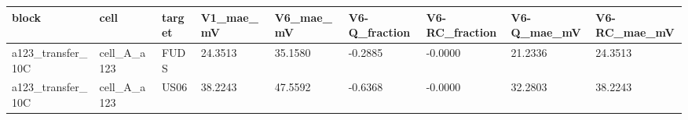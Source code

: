 \begin{tabular}{lllllllll}
\hline
block & cell & target & V1\_mae\_mV & V6\_mae\_mV & V6-Q\_fraction & V6-RC\_fraction & V6-Q\_mae\_mV & V6-RC\_mae\_mV \\
\hline
a123\_transfer\_10C & cell\_A\_a123 & FUDS & 24.3513 & 35.1580 & -0.2885 & -0.0000 & 21.2336 & 24.3513 \\
a123\_transfer\_10C & cell\_A\_a123 & US06 & 38.2243 & 47.5592 & -0.6368 & -0.0000 & 32.2803 & 38.2243 \\
\hline
\end{tabular}
